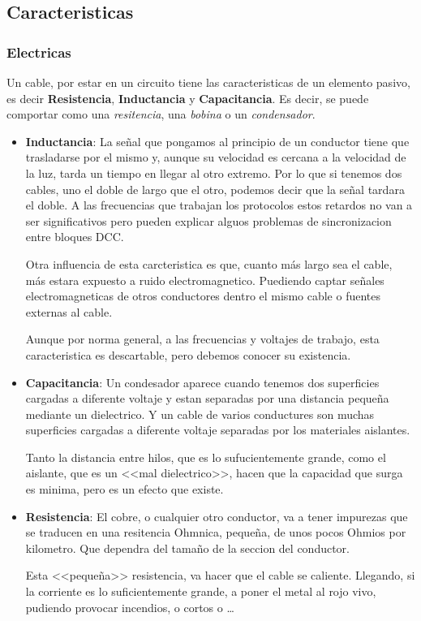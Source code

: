 \subsection{Caracteristicas}
\subsubsection{Electricas}
Un cable, por estar en un circuito tiene las caracteristicas de un elemento pasivo, es decir \textbf{Resistencia}, \textbf{Inductancia} y \textbf{Capacitancia}. Es decir, se puede comportar como una \textit{resitencia}, una \textit{bobina} o un \textit{condensador}.
\begin{itemize}
\item \textbf{Inductancia}: La señal que pongamos al principio de un conductor tiene que trasladarse por el mismo y, aunque su velocidad es cercana a la velocidad de la luz, tarda un tiempo en llegar al otro extremo. Por lo que si tenemos dos cables, uno el doble de largo que el otro, podemos decir que la señal tardara el doble. A las frecuencias que trabajan los protocolos estos retardos no van a ser significativos pero pueden explicar alguos problemas de sincronizacion entre bloques DCC.

Otra influencia de esta carcteristica es que, cuanto más largo sea el cable, más estara expuesto a ruido electromagnetico. Puediendo captar señales electromagneticas de otros conductores dentro el mismo cable o fuentes externas al cable.

Aunque por norma general, a las frecuencias y voltajes de trabajo, esta caracteristica es descartable, pero debemos conocer su existencia.

\item \textbf{Capacitancia}: Un condesador aparece cuando tenemos dos superficies cargadas a diferente voltaje y estan separadas por una distancia pequeña mediante un dielectrico. Y un cable de varios conductures son muchas superficies cargadas a diferente voltaje separadas por los materiales aislantes.

Tanto la distancia entre hilos, que es lo sufucientemente grande, como el aislante, que es un <<mal dielectrico>>, hacen que la capacidad que surga es minima, pero es un efecto que existe.

\item \textbf{Resistencia}: El cobre, o cualquier otro conductor, va a tener impurezas que se traducen en una resitencia Ohmnica, pequeña, de unos pocos Ohmios por kilometro. Que dependra del tamaño de la seccion del conductor. 

Esta <<pequeña>> resistencia, va hacer que el cable se caliente. Llegando, si la corriente es lo suficientemente grande, a poner el metal al rojo vivo, pudiendo provocar incendios, o cortos o \dots
 
\end{itemize}


